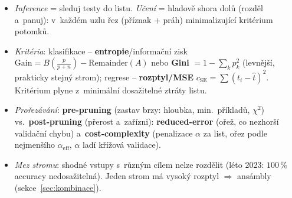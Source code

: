 \begin{poznamka}
\begin{itemize}
  \item \emph{Inference} = sleduj testy do listu. \emph{Učení} = hladově shora dolů (rozděl a~panuj): v~každém uzlu řez (příznak + práh) minimalizující kritérium potomků.
  \item \emph{Kritéria}: klasifikace -- \textbf{entropie}/informační zisk $\mathrm{Gain}=B(\tfrac{p}{p+n})-\mathrm{Remainder}(A)$ nebo \textbf{Gini} $=1-\sum_k p_k^2$ (levnější, prakticky stejný strom); regrese -- \textbf{rozptyl/MSE} $c_{\mathrm{SE}}=\sum(t_i-\hat t)^2$. Kritérium plyne z~minimální dosažitelné ztráty listu.
  \item \emph{Prořezávání}: \textbf{pre-pruning} (zastav brzy: hloubka, min.\ příkladů, $\chi^2$) vs.\ \textbf{post-pruning} (přerost a~zařízni): \textbf{reduced-error} (ořež, co nezhorší validační chybu) a~\textbf{cost-complexity} (penalizace $\alpha$ za list, ořez podle nejmenšího $\alpha_{\mathrm{eff}}$, $\alpha$ ladí křížová validace).
  \item \emph{Mez stromu}: shodné vstupy s~různým cílem nelze rozdělit (léto 2023: $100\,\%$ accuracy nedosažitelná). Jeden strom má vysoký rozptyl $\Rightarrow$ ansámbly (sekce~\ref{sec:kombinace}).
\end{itemize}
\end{poznamka}
